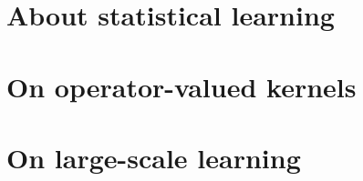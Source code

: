 \section{About statistical learning}
\label{sec:about_statistical_learning}

\section{On operator-valued kernels}
\label{sec:background_on_operator-valued_kernels}

\section{On large-scale learning}
\label{sec:on_large-scale_learning}
